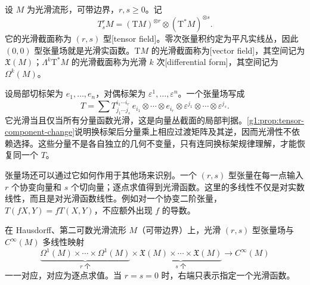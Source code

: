 \begin{definition}
	\label{g1:def:smooth-tensor-field}
	设 \(M\) 为光滑流形，可带边界，\(r,s\geq0\)。记
	\[
		T^r_sM=(\mathrm{T}M)^{\otimes r}\otimes(\mathrm{T}^*M)^{\otimes s}.
	\]
	它的光滑截面称为 \((r,s)\) 型[tensor field]。零次张量积约定为平凡实线丛，因此 \((0,0)\) 型张量场就是光滑实函数。\(\mathrm{T}M\) 的光滑截面称为[vector field]，其空间记为 \(\mathfrak X(M)\)；\(\Lambda^k\mathrm{T}^*M\) 的光滑截面称为光滑 \(k\) 次[differential form]，其空间记为 \(\Omega^k(M)\)。
\end{definition}

设局部切标架为 \(e_1,\ldots,e_n\)，对偶标架为 \(\varepsilon^1,\ldots,\varepsilon^n\)。一个张量场写成
\[
	T=\sum T^{i_1\cdots i_r}_{j_1\cdots j_s}\,
	e_{i_1}\otimes\cdots\otimes e_{i_r}\otimes
	\varepsilon^{j_1}\otimes\cdots\otimes\varepsilon^{j_s}.
\]
它光滑当且仅当所有分量函数光滑，这是向量丛截面的局部判据。\cref{g1:prop:tensor-component-change}说明换标架后分量乘上相应过渡矩阵及其逆，因而光滑性不依赖选择。这些分量不是各自独立的几何不变量，只有连同换标架规律理解，才能恢复同一个 \(T\)。

\ProseParagraphBreak

张量场还可以通过它如何作用于其他场来识别。一个 \((r,s)\) 型张量在每一点输入 \(r\) 个协变向量和 \(s\) 个切向量；逐点求值得到光滑函数。这里的多线性不仅是对实数线性，而且是对光滑函数线性。例如对一个协变二阶张量，\(T(fX,Y)=fT(X,Y)\)，不应额外出现 \(f\) 的导数。

\begin{proposition}
	\label{g1:prop:tensor-field-multilinearity}
	在 Hausdorff、第二可数光滑流形 \(M\)（可带边界）上，光滑 \((r,s)\) 型张量场与 \(C^\infty(M)\) 多线性映射
	\[
		\underbrace{\Omega^1(M)\times\cdots\times\Omega^1(M)}_{r\text{ 个}}
		\times\underbrace{\mathfrak X(M)\times\cdots\times\mathfrak X(M)}_{s\text{ 个}}
		\longrightarrow C^\infty(M)
	\]
	一一对应，对应为逐点求值。当 \(r=s=0\) 时，右端只表示指定一个光滑函数。
\end{proposition}

